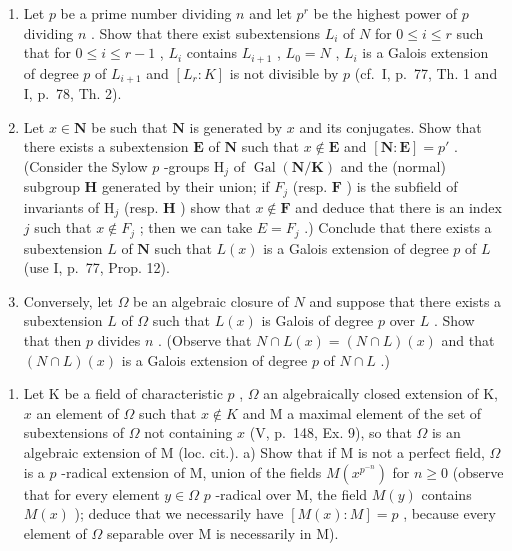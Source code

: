 \begin{enumerate}
\def\labelenumi{\alph{enumi})}
\item
  Let \(p\) be a prime number dividing \(n\) and let \(p^r\) be the highest power of \(p\) dividing \(n\) . Show that there exist subextensions \(L_i\) of \(N\) for \(0 \leqslant i \leqslant r\) such that for \(0 \leqslant i \leqslant r - 1\) , \(L_i\) contains \(L_{i+1}\) , \(L_0 = N\) , \(L_i\) is a Galois extension of degree \(p\) of \(L_{i+1}\) and \([L_r: K]\) is not divisible by \(p\) (cf.~I, p.~77, Th. 1 and I, p.~78, Th. 2).
\item
  Let \(x \in \mathbf{N}\) be such that \(\mathbf{N}\) is generated by \(x\) and its conjugates. Show that there exists a subextension \(\mathbf{E}\) of \(\mathbf{N}\) such that \(x \notin \mathbf{E}\) and \([\mathbf{N} : \mathbf{E}] = p'\) . (Consider the Sylow \(p\) -groups \(\mathrm{H}_j\) of \(\operatorname{Gal}(\mathbf{N} / \mathbf{K})\) and the (normal) subgroup \(\mathbf{H}\) generated by their union; if \(F_j\) (resp. \(\mathbf{F}\) ) is the subfield of invariants of \(\mathrm{H}_j\) (resp. \(\mathbf{H}\) ) show that \(x \notin \mathbf{F}\) and deduce that there is an index \(j\) such that \(x \notin F_j\) ; then we can take \(E = F_{j}\) .) Conclude that there exists a subextension \(L\) of \(\mathbf{N}\) such that \(L(x)\) is a Galois extension of degree \(p\) of \(L\) (use I, p.~77, Prop. 12).
\item
  Conversely, let \(\Omega\) be an algebraic closure of \(N\) and suppose that there exists a subextension \(L\) of \(\Omega\) such that \(L(x)\) is Galois of degree \(p\) over \(L\) . Show that then \(p\) divides \(n\) . (Observe that \(N \cap L(x) = (N \cap L)(x)\) and that \((N \cap L)(x)\) is a Galois extension of degree \(p\) of \(N \cap L\) .)
\end{enumerate}

\begin{enumerate}
\def\labelenumi{\arabic{enumi})}
\setcounter{enumi}{8}
\tightlist
\item
  Let K be a field of characteristic \(p\) , \(\Omega\) an algebraically closed extension of K, \(x\) an element of \(\Omega\) such that \(x \notin K\) and M a maximal element of the set of subextensions of \(\Omega\) not containing \(x\) (V, p.~148, Ex. 9), so that \(\Omega\) is an algebraic extension of M (loc. cit.). a) Show that if M is not a perfect field, \(\Omega\) is a \(p\) -radical extension of M, union of the fields \(M(x^{p^{-n}})\) for \(n \geqslant 0\) (observe that for every element \(y \in \Omega\) \(p\) -radical over M, the field \(M(y)\) contains \(M(x)\) ); deduce that we necessarily have \([M(x):M] = p\) , because every element of \(\Omega\) separable over M is necessarily in M).
\end{enumerate}

